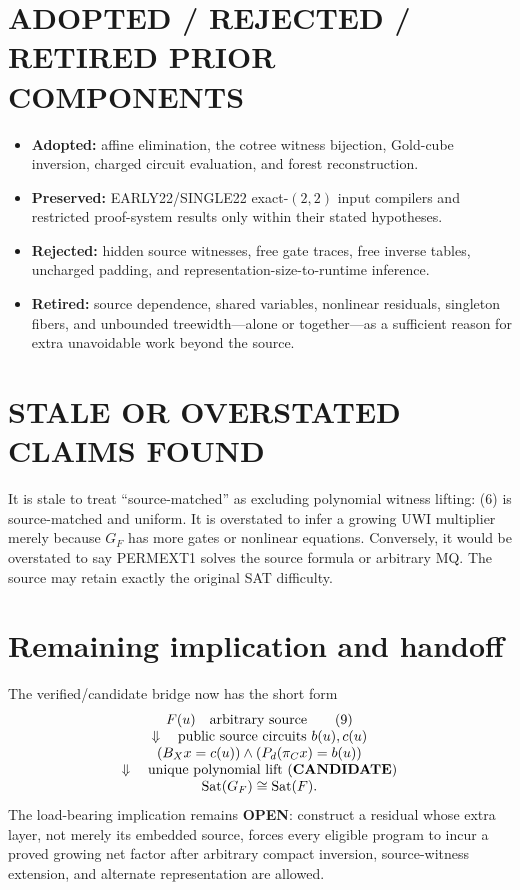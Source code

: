 \documentclass[11pt]{article}
\newcommand{\CAND}{\textbf{CANDIDATE}}
\newcommand{\OPEN}{\textbf{OPEN}}
\begin{document}
\section{ADOPTED / REJECTED / RETIRED PRIOR COMPONENTS}
\begin{itemize}
\item \textbf{Adopted:} affine elimination, the cotree witness bijection,
Gold-cube inversion, charged circuit evaluation, and forest reconstruction.
\item \textbf{Preserved:} EARLY22/SINGLE22 exact-$(2,2)$ input compilers and
restricted proof-system results only within their stated hypotheses.
\item \textbf{Rejected:} hidden source witnesses, free gate traces, free
inverse tables, uncharged padding, and representation-size-to-runtime
inference.
\item \textbf{Retired:} source dependence, shared variables, nonlinear
residuals, singleton fibers, and unbounded treewidth---alone or together---as
a sufficient reason for extra unavoidable work beyond the source.
\end{itemize}

\section{STALE OR OVERSTATED CLAIMS FOUND}
It is stale to treat ``source-matched'' as excluding polynomial witness
lifting: (6) is source-matched and uniform.  It is overstated to infer a
growing UWI multiplier merely because $G_F$ has more gates or nonlinear
equations.  Conversely, it would be overstated to say PERMEXT1 solves the
source formula or arbitrary MQ.  The source may retain exactly the original
SAT difficulty.

\section{Remaining implication and handoff}
The verified/candidate bridge now has the short form
\[
\begin{array}{c}
F(u)\quad\text{arbitrary source}\tag{9}\\
\Downarrow\quad\text{public source circuits }b(u),c(u)\\
(B_Xx=c(u))\land(P_d(\pi_Cx)=b(u))\\
\Downarrow\quad\text{unique polynomial lift (\CAND)}\\
\operatorname{Sat}(G_F)\cong\operatorname{Sat}(F).
\end{array}
\]
The load-bearing implication remains \OPEN{}: construct a residual whose
extra layer, not merely its embedded source, forces every eligible program to
incur a proved growing net factor after arbitrary compact inversion,
source-witness extension, and alternate representation are allowed.
\end{document}
